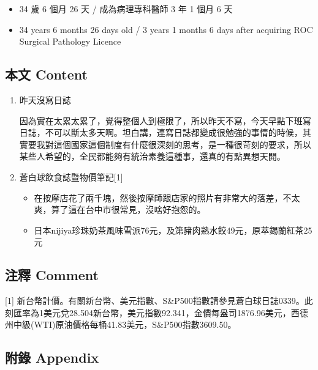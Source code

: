 \documentclass[
]{article}
\providecommand{\tightlist}{%
  \setlength{\itemsep}{0pt}\setlength{\parskip}{0pt}}
\begin{document}
\begin{itemize}
\tightlist
\item
  34 歲 6 個月 26 天 / 成為病理專科醫師 3 年 1 個月 6 天
\item
  34 years 6 months 26 days old / 3 years 1 months 6 days after
  acquiring ROC Surgical Pathology Licence
\end{itemize}

\hypertarget{ux672cux6587-content-71}{%
\subsection{本文 Content}\label{ux672cux6587-content-71}}

\begin{enumerate}
\def\labelenumi{\arabic{enumi}.}
\item
  昨天沒寫日誌

  因為實在太累太累了，覺得整個人到極限了，所以昨天不寫，今天早點下班寫日誌，不可以斷太多天啊。坦白講，連寫日誌都變成很勉強的事情的時候，其實要我對這個國家這個制度有什麼很深刻的思考，是一種很苛刻的要求，所以某些人希望的，全民都能夠有統治素養這種事，還真的有點異想天開。
\item
  蒼白球飲食誌暨物價筆記{[}1{]}

  \begin{itemize}
  \tightlist
  \item
    在按摩店花了兩千塊，然後按摩師跟店家的照片有非常大的落差，不太爽，算了這在台中市很常見，沒啥好抱怨的。
  \item
    日本nijiya珍珠奶茶風味雪派76元，及第豬肉熟水餃49元，原萃錫蘭紅茶25元
  \end{itemize}
\end{enumerate}

\hypertarget{ux6ce8ux91cb-comment-71}{%
\subsection{注釋 Comment}\label{ux6ce8ux91cb-comment-71}}

{[}1{]}
新台幣計價。有關新台幣、美元指數、S\&P500指數請參見蒼白球日誌0339。此刻匯率為1美元兌28.504新台幣，美元指數92.341，金價每盎司1876.96美元，西德州中級(WTI)原油價格每桶41.83美元，S\&P500指數3609.50。

\hypertarget{ux9644ux9304-appendix-71}{%
\subsection{附錄 Appendix}\label{ux9644ux9304-appendix-71}}
\end{document}
